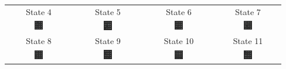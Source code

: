 \documentclass{article}
\begin{document}
\begin{appendices}
\begin{center}
\begin{tabular}{c c c c}
				State 4 & State 5 & State 6 & State 7 \\
				\includegraphics[width=0.135\textwidth,keepaspectratio]{State-8.png} & \includegraphics[width=0.135\textwidth,keepaspectratio]{State-9.png} & \includegraphics[width=0.135\textwidth,keepaspectratio]{State-10.png} & \includegraphics[width=0.135\textwidth,keepaspectratio]{State-11.png} \\
				State 8 & State 9 & State 10 & State 11 \\
				\includegraphics[width=0.135\textwidth,keepaspectratio]{State-12.png} & \includegraphics[width=0.135\textwidth,keepaspectratio]{State-13.png} & \includegraphics[width=0.135\textwidth,keepaspectratio]{State-14.png} & \includegraphics[width=0.135\textwidth,keepaspectratio]{State-15.png} \\

\end{tabular}
\end{center}
\end{appendices}
\end{document}
